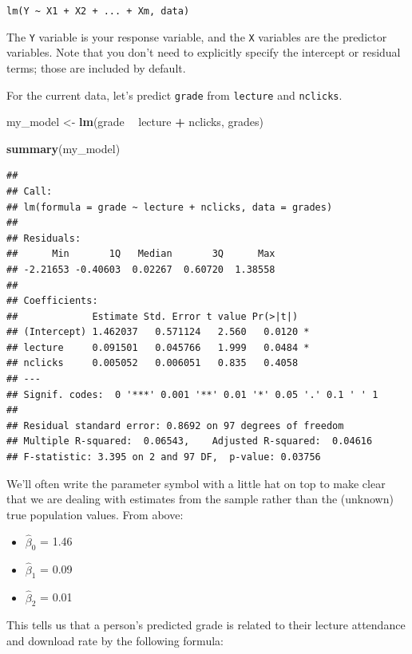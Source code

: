 \documentclass[]{book}
\newenvironment{Shaded}{\begin{snugshade}}{\end{snugshade}}
\newcommand{\KeywordTok}[1]{\textcolor[rgb]{0.13,0.29,0.53}{\textbf{#1}}}
\newcommand{\NormalTok}[1]{#1}
\newcommand{\OperatorTok}[1]{\textcolor[rgb]{0.81,0.36,0.00}{\textbf{#1}}}
\newcommand{\StringTok}[1]{\textcolor[rgb]{0.31,0.60,0.02}{#1}}
\providecommand{\tightlist}{%
  \setlength{\itemsep}{0pt}\setlength{\parskip}{0pt}}
\begin{document}
\texttt{lm(Y\ \textasciitilde{}\ X1\ +\ X2\ +\ ...\ +\ Xm,\ data)}

The \texttt{Y} variable is your response variable, and the \texttt{X} variables are the predictor variables. Note that you don't need to explicitly specify the intercept or residual terms; those are included by default.

For the current data, let's predict \texttt{grade} from \texttt{lecture} and \texttt{nclicks}.

\begin{Shaded}
\begin{Highlighting}[]
\NormalTok{my_model <-}\StringTok{ }\KeywordTok{lm}\NormalTok{(grade }\OperatorTok{~}\StringTok{ }\NormalTok{lecture }\OperatorTok{+}\StringTok{ }\NormalTok{nclicks, grades)}

\KeywordTok{summary}\NormalTok{(my_model)}
\end{Highlighting}
\end{Shaded}

\begin{verbatim}
## 
## Call:
## lm(formula = grade ~ lecture + nclicks, data = grades)
## 
## Residuals:
##      Min       1Q   Median       3Q      Max 
## -2.21653 -0.40603  0.02267  0.60720  1.38558 
## 
## Coefficients:
##             Estimate Std. Error t value Pr(>|t|)  
## (Intercept) 1.462037   0.571124   2.560   0.0120 *
## lecture     0.091501   0.045766   1.999   0.0484 *
## nclicks     0.005052   0.006051   0.835   0.4058  
## ---
## Signif. codes:  0 '***' 0.001 '**' 0.01 '*' 0.05 '.' 0.1 ' ' 1
## 
## Residual standard error: 0.8692 on 97 degrees of freedom
## Multiple R-squared:  0.06543,	Adjusted R-squared:  0.04616 
## F-statistic: 3.395 on 2 and 97 DF,  p-value: 0.03756
\end{verbatim}

We'll often write the parameter symbol with a little hat on top to make clear that we are dealing with estimates from the sample rather than the (unknown) true population values. From above:

\begin{itemize}
\tightlist
\item
  \(\hat{\beta}_0\) = 1.46
\item
  \(\hat{\beta}_1\) = 0.09
\item
  \(\hat{\beta}_2\) = 0.01
\end{itemize}

This tells us that a person's predicted grade is related to their lecture attendance and download rate by the following formula:
\end{document}
